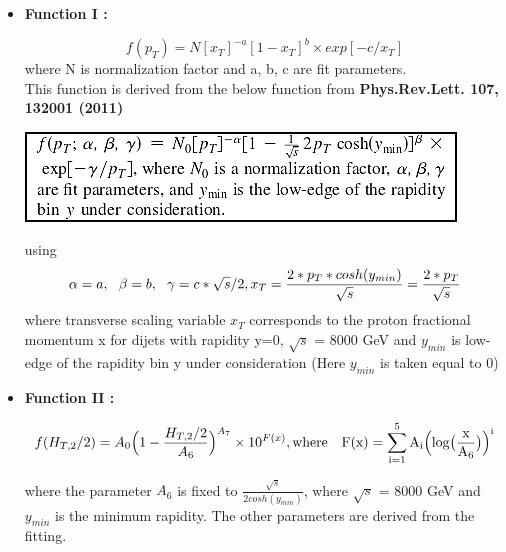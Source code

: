 \begin{itemize}
\item {\bf Function I : }

  \begin{equation}
    \label{eq:func1}
    f(p_{T}) = N[x_{T}]^{-a}[1-x_{T}]^{b} \times exp[-c/x_{T}]
  \end{equation}
  where N is normalization factor and a, b, c are fit parameters.\\

  This function is derived from the below function from \textbf{Phys.Rev.Lett. 107, 132001 (2011)}\\
  \begin{center}
    \includegraphics[scale = 0.65]{Plots_HT_2_150/Formula.png} 
  \end{center}
  using 
  \begin{equation}
    \alpha = a,~~\beta = b,~~\gamma = c*\sqrt{s}/2, \\
    x_{T} = \frac{2*p_{T}*cosh(y_{min})}{\sqrt{s}} = \frac{2*p_{T}}{\sqrt{s}}
  \end{equation}
  where transverse scaling variable $x_{T}$ corresponds to the proton fractional momentum x for dijets with rapidity y=0, $\sqrt{s}$ = 8000 GeV and $y_{min}$ is low-edge of the rapidity bin y under consideration (Here $y_{min}$ is taken equal to 0) \\ 

\item {\bf Function II : }

  \begin{equation}
    \label{eq:func2}
    f(H_{T,2}/2) = A_{0}\Big(1-\frac{H_{T,2}/2}{A_{6}}\Big)^{A_{7}} \times 10^{F(x)}, \rm where ~~~{F(x) = \sum\limits_{i=1}^5 A_{i}\Big(log\big(\frac{x}{A_{6}}\big)\Big)^{i}}
  \end{equation}

  where the parameter $A_{6}$ is fixed to $\frac{\sqrt{s}}{2cosh(y_{min})}$, where $\sqrt{s}$ = 8000 GeV and $y_{min}$ is 
  the minimum rapidity. The other parameters are derived from the fitting.
\end{itemize}

